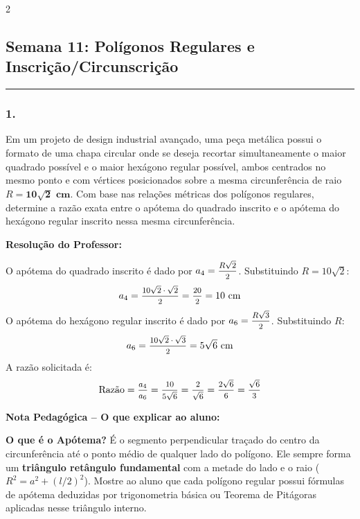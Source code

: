 \par\vspace{0.3cm} 
\raggedcolumns
\begin{multicols*}{2}
\vspace{0.1cm}

\subsection*{Semana 11: Polígonos Regulares e Inscrição/Circunscrição}
\vspace{-0.2cm}\noindent\rule{\linewidth}{1.5pt} 
\par\vspace{\espacoPosTitulo}

\subsubsection*{1.} Em um projeto de design industrial avançado, uma peça metálica possui o formato de uma chapa circular onde se deseja recortar simultaneamente o maior quadrado possível e o maior hexágono regular possível, ambos centrados no mesmo ponto e com vértices posicionados sobre a mesma circunferência de raio $R = \mathbf{10\sqrt{2}\text{ cm}}$. Com base nas relações métricas dos polígonos regulares, determine a razão exata entre o apótema do quadrado inscrito e o apótema do hexágono regular inscrito nessa mesma circunferência.

\ifgabarito
    \begin{tcolorbox}[colback=CorTitUm!5, colframe=CorTitUm, boxrule=1pt, arc=4pt, left=6pt, right=6pt, top=6pt, bottom=6pt]
    \small\textbf{\textcolor{CorTitUm}{Resolução do Professor:}}\par\vspace{0.1cm}
    \color{CinzaEscuro}
    O apótema do quadrado inscrito é dado por $a_4 = \mfrac{R\sqrt{2}}{2}$. Substituindo $R = 10\sqrt{2}$:
    \[ a_4 = \mfrac{10\sqrt{2} \cdot \sqrt{2}}{2} = \mfrac{20}{2} = 10 \text{ cm} \]
    O apótema do hexágono regular inscrito é dado por $a_6 = \mfrac{R\sqrt{3}}{2}$. Substituindo $R$:
    \[ a_6 = \mfrac{10\sqrt{2} \cdot \sqrt{3}}{2} = 5\sqrt{6} \text{ cm} \]
    A razão solicitada é:
    \[ \text{Razão} = \mfrac{a_4}{a_6} = \mfrac{10}{5\sqrt{6}} = \mfrac{2}{\sqrt{6}} = \mfrac{2\sqrt{6}}{6} = \mfrac{\sqrt{6}}{3} \]
    \end{tcolorbox}
    
    \begin{boxpedagogica}
    \textbf{\textcolor{CorVerdeBorda}{Nota Pedagógica -- O que explicar ao aluno:}}\par\vspace{0.1cm}
    \color{CinzaEscuro}
    \textbf{O que é o Apótema?} É o segmento perpendicular traçado do centro da circunferência até o ponto médio de qualquer lado do polígono. Ele sempre forma um \textbf{triângulo retângulo fundamental} com a metade do lado e o raio ($R^2 = a^2 + (l/2)^2$). Mostre ao aluno que cada polígono regular possui fórmulas de apótema deduzidas por trigonometria básica ou Teorema de Pitágoras aplicadas nesse triângulo interno.
    \end{boxpedagogica}
\fi


\end{multicols*}
